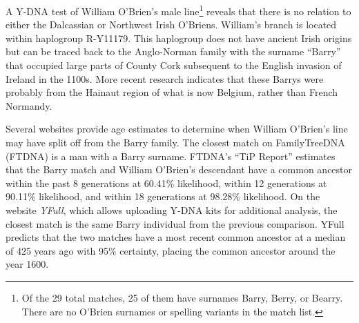 
A Y-DNA test of William O'Brien's male line\footnote{Of the 29 total matches, 25 of them have surnames Barry, Berry, or Bearry. There are no O'Brien surnames or spelling variants in the match list.\cite{BigY}} reveals that there is no relation to either the Dalcassian or Northwest Irish O'Briens. William's branch is located within haplogroup R-Y11179. This haplogroup does not have ancient Irish origins but can be traced back to the Anglo-Norman family with the surname ``Barry'' that occupied large parts of County Cork subsequent to the English invasion of Ireland in the 1100s.\cite{BarrymoreDNA:9} More recent research indicates that these Barrys were probably from the Hainaut region of what is now Belgium, rather than French Normandy.\cite{BarrymoreDNA:2-4}

Several websites provide age estimates to determine when William O'Bri\-en's line may have split off from the Barry family. The closest match on FamilyTreeDNA (FTDNA) is a man with a Barry surname. FTDNA's ``TiP Report'' estimates that the Barry match and William O'Brien's descendant have a common ancestor within the past 8 generations at 60.41\% likelihood, within 12 generations at 90.11\% likelihood, and within 18 generations at 98.28\% likelihood.\cite{TiP} On the website \textit{YFull}, which allows uploading Y-DNA kits for additional analysis, the closest match is the same Barry individual from the previous comparison. YFull predicts that the two matches have a most recent common ancestor at a median of 425 years ago with 95\% certainty, placing the common ancestor around the year 1600.\cite{YFull}

